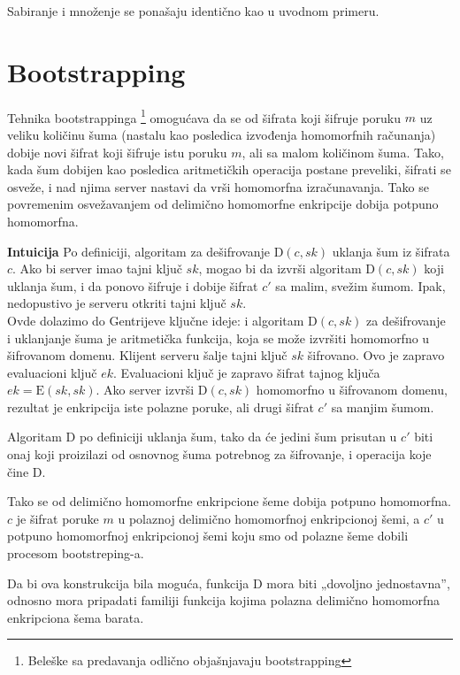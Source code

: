 Sabiranje i mno\v zenje se pona\v saju identi\v cno kao u uvodnom primeru.

\section{Bootstrapping}
Tehnika bootstrappinga \footnote{Bele\v ske sa predavanja \cite{MITHenzingerHE2} odli\v cno obja\v snjavaju bootstrapping} omogu\' cava da se od \v sifrata koji šifruje poruku $m$ uz veliku količinu šuma (nastalu kao posledica izvođenja homomorfnih računanja) dobije novi \v sifrat koji šifruje istu poruku $m$, ali sa malom količinom šuma. Tako, kada \v sum dobijen kao posledica aritmeti\v ckih operacija postane preveliki, \v sifrati se osve\v ze, i nad njima server nastavi da vr\v si homomorfna izra\v cunavanja. Tako se povremenim osve\v zavanjem od delimi\v cno homomorfne enkripcije dobija potpuno homomorfna. 

\textbf{Intuicija} Po definiciji, algoritam za de\v sifrovanje $\mathrm{D}(c, sk)$ uklanja \v sum iz \v sifrata $c$. Ako bi server imao tajni klju\v c $sk$, mogao bi da izvr\v si algoritam $\mathrm{D}(c, sk)$ koji uklanja \v sum, i da ponovo \v sifruje i dobije \v sifrat $c'$ sa malim, sve\v zim \v sumom. Ipak, nedopustivo je serveru otkriti tajni klju\v c $sk$.
\\
Ovde dolazimo do Gentrijeve klju\v cne ideje: i algoritam $\mathrm{D}(c, sk)$ za de\v sifrovanje i uklanjanje \v suma je aritmeti\v cka funkcija, koja se mo\v ze izvr\v siti homomorfno u \v sifrovanom domenu. Klijent serveru \v salje tajni klju\v c $sk$ \v sifrovano. Ovo je zapravo evaluacioni klju\v c $ek$. Evaluacioni klju\v c je zapravo \v sifrat tajnog klju\v ca $ek = \mathrm{E}(sk, sk)$.
Ako server izvr\v si $\mathrm{D}(c, sk)$ homomorfno u \v sifrovanom domenu, rezultat je enkripcija iste polazne poruke, ali drugi \v sifrat $c'$ sa manjim \v sumom.

Algoritam $\mathrm{D}$ po definiciji uklanja \v sum, tako da \' ce jedini \v sum prisutan u $c'$ biti onaj koji proizilazi od osnovnog \v suma potrebnog za \v sifrovanje, i operacija koje \v cine $\mathrm{D}$.

Tako se od delimi\v cno homomorfne enkripcione \v seme dobija potpuno homomorfna. $c$ je \v sifrat poruke $m$ u polaznoj delimi\v cno homomorfnoj enkripcionoj \v semi, a $c'$ u potpuno homomorfnoj enkripcionoj \v semi koju smo od polazne \v seme dobili procesom bootstreping-a.

Da bi ova konstrukcija bila mogu\' ca, funkcija $\mathrm{D}$ mora biti „dovoljno jednostavna”, odnosno mora pripadati familiji funkcija  kojima polazna delimi\v cno homomorfna enkripciona \v sema barata.

